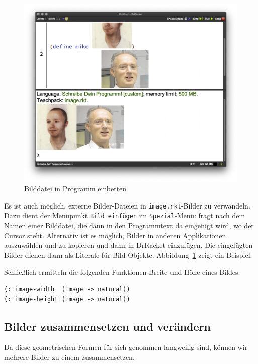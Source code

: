 \begin{figure}[tb]
  \centering
  \includegraphics[height=0.4\textheight]{i1world/insert-image}
  \caption{Bilddatei in Programm einbetten}
  \label{fig:image-insert}
\end{figure}
Es ist auch möglich, externe Bilder-Dateien in
\texttt{image.rkt}-Bilder zu verwandeln.  Dazu dient der Menüpunkt
\texttt{Bild einfügen} im \texttt{Spezial}-Menü: \drscheme{} fragt
nach dem Namen einer Bilddatei, die dann in den Programmtext da
eingefügt wird, wo der Cursor steht.  Alternativ ist es möglich,
Bilder in anderen Applikationen auszuwählen und zu kopieren und dann
in DrRacket einzufügen.  Die eingefügten Bilder dienen dann als
Literale für Bild-Objekte.  Abbildung~\ref{fig:image-insert} zeigt ein
Beispiel.

Schließlich ermitteln die folgenden Funktionen Breite und Höhe
eines Bildes:
%
\begin{lstlisting}
(: image-width  (image -> natural))
(: image-height (image -> natural))
\end{lstlisting}
%

\subsection{Bilder zusammensetzen und verändern}

Da diese geometrischen Formen für sich genommen langweilig sind,
können wir mehrere Bilder zu einem zusammensetzen.

